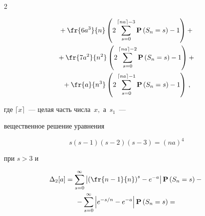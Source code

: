 \begin{multicols}{2}


 


\noindent  


\begin{multline}


  {}+\fr{6a^3}{n}\left(2\sum\limits_{s=0}^{\lceil na \rceil-3} 


  \mathbf{P}\left(S_n=s\right)-1 \right)+{}


 \\ 


 {}+\fr{7a^2}{n^2}\left(2\sum\limits_{s=0}^{\lceil na \rceil-2} 


 \mathbf{P}\left(S_n=s\right)-1 \right)


 +{}\\


 {}+\fr{a}{n^3}\left(2\sum\limits_{s=0}^{\lceil na \rceil-1} 


 \mathbf{P}\left(S_n=s\right)-1 \right)\,,


 \label{e55-ch}


 \end{multline}


 


 


 \noindent


 где $\lceil x \rceil$~--- целая часть числа~$x,$ а~$s_1$~--- 


 вещественное решение уравнения 


 \begin{equation*}


 s(s-1)(s-2)(s-3)=(na)^4


 \end{equation*}


 при $s>3$  и


 \begin{multline*}


 \Delta_2[a]=


  \sum\limits_{s=0}^\infty \left|\left(\fr{n-1}{n}\right)^s-e^{-a} \right|


 \mathbf{P}\left(S_n=s\right)


  -{}\\


  {}-\sum\limits_{s=0}^\infty \left|e^{-s/n}-e^{-a} \right|


 \mathbf{P}\left(S_n=s\right)={}


 \end{multline*}



\end{multicols}

